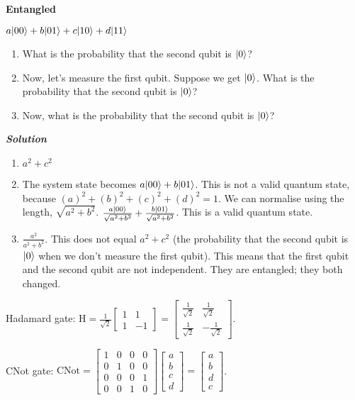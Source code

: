 \begin{example}
    \textbf{Entangled}

    $a\lvert00\rangle + b\lvert01\rangle + c\lvert10\rangle + d\lvert11\rangle$\\
    \begin{enumerate}
        \item What is the probability that the second qubit is $\lvert0\rangle$?
        \item Now, let's measure the first qubit. Suppose we get $\lvert0\rangle$. What is the probability that the second qubit is $\lvert0\rangle$?
        \item Now, what is the probability that the second qubit is $\lvert0\rangle$?
    \end{enumerate}
    \textbf{\emph{Solution}}
    \begin{enumerate}
        \item $a^2 + c^2$
        \item The system state becomes $a\lvert00\rangle + b\lvert01\rangle$. This is not a valid quantum state, because $(a)^2 + (b)^2 + (c)^2 + (d)^2 = 1$. We can normalise using the length, $\sqrt{a^2 + b^2}$. $\frac{a\lvert00\rangle}{\sqrt{a^2 + b^2}} + \frac{b\lvert01\rangle}{\sqrt{a^2 + b^2}}$. This is a valid quantum state.
        \item $\frac{a^2}{a^2 + b^2}$. This does not equal $a^2 + c^2$ (the probability that the second qubit is $\lvert0\rangle$ when we don't measure the first qubit). This means that the first qubit and the second qubit are not independent. They are entangled; they both changed.
    \end{enumerate}
\end{example}

Hadamard gate: $\mathrm{H} = \frac{1}{\sqrt{2}}\begin{bmatrix}
    1 & 1\\
    1 & -1
\end{bmatrix} = \begin{bmatrix}
    \frac{1}{\sqrt{2}} & \frac{1}{\sqrt{2}}\\
    \frac{1}{\sqrt{2}} & -\frac{1}{\sqrt{2}}
\end{bmatrix}$.

CNot gate: $\mathrm{CNot} = \begin{bmatrix}
    1 & 0 & 0 & 0\\
    0 & 1 & 0 & 0\\
    0 & 0 & 0 & 1\\
    0 & 0 & 1 & 0
\end{bmatrix} \begin{bmatrix}
    a\\
    b\\
    c\\
    d
\end{bmatrix} = \begin{bmatrix}
    a\\
    b\\
    d\\
    c
\end{bmatrix}$.


